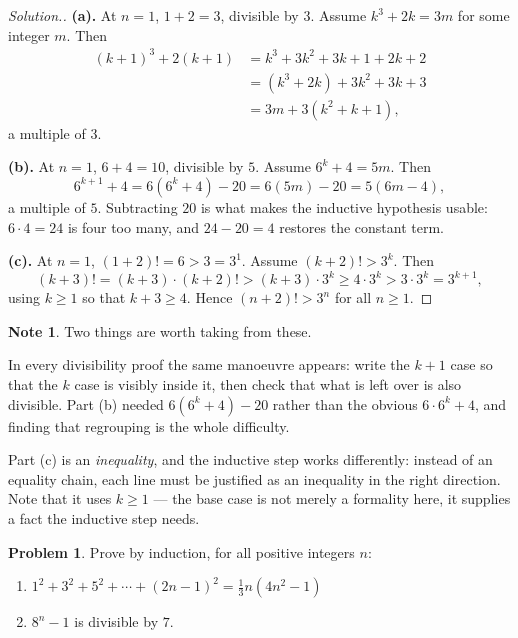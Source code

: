 \documentclass[11pt,a4paper]{article}
\theoremstyle{definition}
\newtheorem{note}[thm]{Note}
\newtheorem{problemx}{Problem}[section]
\newenvironment{problem}{\begin{problemx}}{\end{problemx}}
\newenvironment{solution}
  {\renewcommand{\qedsymbol}{}\begin{proof}[\textit{Solution}.]}
  {\end{proof}}
\begin{document}
\begin{solution}
\textbf{(a).} At $n=1$, $1+2=3$, divisible by $3$. Assume $k^{3}+2k=3m$ for some
integer $m$. Then
\begin{align*}
(k+1)^{3}+2(k+1)&=k^{3}+3k^{2}+3k+1+2k+2\\
                &=\left(k^{3}+2k\right)+3k^{2}+3k+3\\
                &=3m+3\left(k^{2}+k+1\right),
\end{align*}
a multiple of $3$.

\textbf{(b).} At $n=1$, $6+4=10$, divisible by $5$. Assume $6^{k}+4=5m$. Then
$$6^{k+1}+4=6\left(6^{k}+4\right)-20=6(5m)-20=5(6m-4),$$
a multiple of $5$. Subtracting $20$ is what makes the inductive hypothesis usable:
$6\cdot 4=24$ is four too many, and $24-20=4$ restores the constant term.

\textbf{(c).} At $n=1$, $(1+2)!=6>3=3^{1}$. Assume $(k+2)!>3^{k}$. Then
$$\left(k+3\right)!=(k+3)\cdot(k+2)!>(k+3)\cdot 3^{k}\geq 4\cdot 3^{k}>3\cdot 3^{k}
=3^{k+1},$$
using $k\geq 1$ so that $k+3\geq 4$. Hence $(n+2)!>3^{n}$ for all $n\geq 1$.
\end{solution}

\begin{note}
Two things are worth taking from these.

In every divisibility proof the same manoeuvre appears: write the $k+1$ case so
that the $k$ case is visibly inside it, then check that what is left over is also
divisible. Part (b) needed $6\left(6^{k}+4\right)-20$ rather than the obvious
$6\cdot 6^{k}+4$, and finding that regrouping is the whole difficulty.

Part (c) is an \emph{inequality}, and the inductive step works differently: instead
of an equality chain, each line must be justified as an inequality in the right
direction. Note that it uses $k\geq 1$ --- the base case is not merely a formality
here, it supplies a fact the inductive step needs.
\end{note}















\pagebreak

\begin{problem}
Prove by induction, for all positive integers $n$:
\begin{enumerate}
\item[(a).] $1^{2}+3^{2}+5^{2}+\cdots+(2n-1)^{2}=\frac{1}{3}n\left(4n^{2}-1\right)$
\item[(b).] $8^{n}-1$ is divisible by $7$.
\end{enumerate}
\end{problem}
\end{document}
